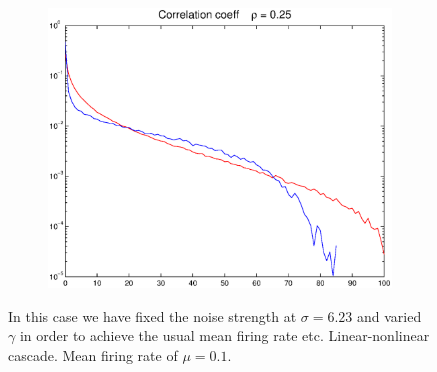 \documentclass[11pt]{article}
\begin{document}
\begin{figure}[H]
	\begin{subfigure}[h]{0.66\textwidth}
	\centering
	\includegraphics[width=\textwidth]{../Figures/Lin_Filter/Filt_DG_indiv_mu_01_rho_25_gamma_changed}
	\label{fig12}
	\end{subfigure}
	\caption{\footnotesize In this case we have fixed the noise strength at $\sigma = 6.23$ and varied $\gamma$ in order to achieve the usual mean firing rate etc. Linear-nonlinear cascade. Mean firing rate of $\mu = 0.1$.}
\end{figure}
\end{document}
